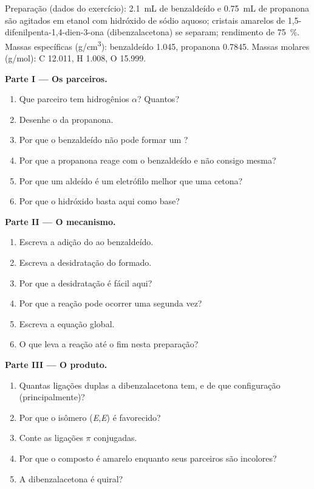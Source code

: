 \begin{problem}
\label{pb:b2:enolates-aldol:1}
Preparação (dados do exercício): \qty{2.1}{mL} de benzaldeído e \qty{0.75}{mL} de propanona são agitados
em etanol com hidróxido de sódio aquoso; cristais amarelos de 1,5-difenilpenta-1,4-dien-3-ona
(dibenzalacetona) se separam; rendimento de 75~\%. Massas específicas (\unit{g/cm^3}): benzaldeído 1.045,
propanona 0.7845. Massas molares (\unit{g/mol}): C 12.011, H 1.008, O 15.999.

\medskip
\noindent\textbf{Parte I --- Os parceiros.}
\begin{enumerate}
  \item Que parceiro tem hidrogênios $\alpha$? Quantos?
  \item Desenhe o  da propanona.
  \item Por que o benzaldeído não pode formar um ?
  \item Por que a propanona reage com o benzaldeído e não consigo mesma?
  \item Por que um aldeído é um eletrófilo melhor que uma cetona?
  \item Por que o hidróxido basta aqui como base?
\end{enumerate}

\medskip
\noindent\textbf{Parte II --- O mecanismo.}
\begin{enumerate}[resume]
  \item Escreva a adição do  ao benzaldeído.
  \item Escreva a desidratação do  formado.
  \item Por que a desidratação é fácil aqui?
  \item Por que a reação pode ocorrer uma segunda vez?
  \item Escreva a equação global.
  \item O que leva a reação até o fim nesta preparação?
\end{enumerate}

\medskip
\noindent\textbf{Parte III --- O produto.}
\begin{enumerate}[resume]
  \item Quantas ligações duplas  a dibenzalacetona tem, e de que configuração (principalmente)?
  \item Por que o isômero (\textit{E},\textit{E}) é favorecido?
  \item Conte as ligações $\pi$ conjugadas.
  \item Por que o composto é amarelo enquanto seus parceiros são incolores?
  \item A dibenzalacetona é quiral?
\end{enumerate}


\end{problem}
